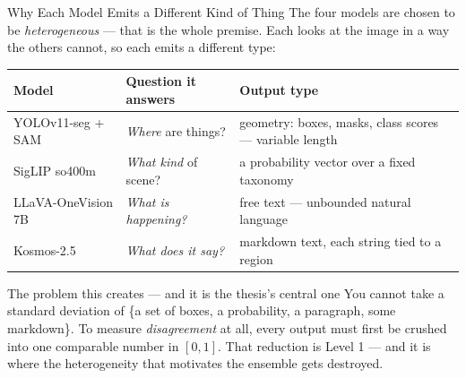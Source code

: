 \documentclass[aspectratio=169,11pt]{beamer}
\begin{document}
\begin{frame}{Why Each Model Emits a Different Kind of Thing}
\small
The four models are chosen to be \emph{heterogeneous} --- that is the whole premise. Each looks at the image in a way the others cannot, so each emits a different type:
\vspace{1mm}
\begin{center}\scriptsize
\begin{tabular}{@{}l l l@{}}
\toprule
\textbf{Model} & \textbf{Question it answers} & \textbf{Output type} \\
\midrule
YOLOv11-seg + SAM & \emph{Where} are things? & geometry: boxes, masks, class scores --- variable length \\
SigLIP so400m & \emph{What kind} of scene? & a probability vector over a fixed taxonomy \\
LLaVA-OneVision 7B & \emph{What is happening?} & free text --- unbounded natural language \\
Kosmos-2.5 & \emph{What does it say?} & markdown text, each string tied to a region \\
\bottomrule
\end{tabular}
\end{center}
\vspace{1.5mm}
\begin{alertblock}{\small The problem this creates --- and it is the thesis's central one}
\footnotesize You cannot take a standard deviation of \{a set of boxes, a probability, a paragraph, some markdown\}. To measure \emph{disagreement} at all, every output must first be crushed into one comparable number in $[0,1]$. That reduction is Level 1 --- and it is where the heterogeneity that motivates the ensemble gets destroyed.
\end{alertblock}
\end{frame}
\end{document}
